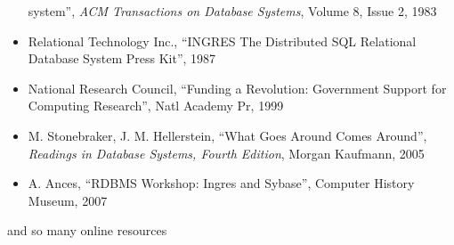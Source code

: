 \begin{itemize}
       system'', {\it ACM Transactions on Database Systems}, Volume 8,
       Issue 2, 1983
 \item Relational Technology Inc., ``INGRES The Distributed SQL
       Relational Database System Press Kit'', 1987
 \item National Research Council, ``Funding a Revolution: Government
       Support for Computing Research'', Natl Academy Pr, 1999
 \item M. Stonebraker, J. M. Hellerstein, ``What Goes Around Comes
       Around'', {\it Readings in Database Systems, Fourth Edition},
       Morgan Kaufmann, 2005
 \item A. Ances, ``RDBMS Workshop: Ingres and Sybase'', Computer
       History Museum, 2007
\end{itemize}

and so many online resources

\normalsize